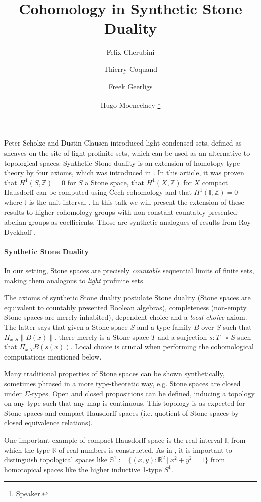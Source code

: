 \documentclass[letterpaper]{../util/easychair}
\title{Cohomology in Synthetic Stone Duality 
}
\author{
Felix Cherubini %
\and 
 Thierry Coquand%
\and 
 Freek Geerligs%
\and
 Hugo Moeneclaey %
\thanks{Speaker.}%
}
\institute{
  University of Gothenburg and Chalmers University of Technology, Gothenburg, Sweden%
}
\newcommand{\R}{\mathbb{R}}
\newcommand{\Z}{\mathbb{Z}}
\newcommand{\I}{\mathbb{I}}
\newcommand{\bS}{\mathbb{S}}
\begin{document}
\maketitle
Peter Scholze and Dustin Clausen \cite{Scholze} introduced light condensed sets, defined as sheaves on the site of light profinite sets, which can be used as an alternative to topological spaces. 
Synthetic Stone duality is an extension of homotopy type theory by four axioms, which was introduced in \cite{synthetic-stone-duality}. In this article, it was proven that $H^1(S,\Z) = 0$ for $S$ a Stone space, that $H^1(X,\Z)$ for $X$ compact Hausdorff can be computed using \v{C}ech cohomology and that $H^1(\mathbb{I},\Z) = 0$ where $\mathbb{I}$ is the unit interval \cite{synthetic-stone-duality}. In this talk we will present the extension of these results to higher cohomology groups with non-constant countably presented abelian groups as coefficients. Those are synthetic analogues of results from Roy Dyckhoff \cite{dyckhoff76,dyckhoff76-1}.

\paragraph*{Synthetic Stone Duality}

In our setting, Stone spaces are precisely \emph{countable} sequential limits of finite sets, making them analogous to \emph{light} profinite sets. 

The axioms of synthetic Stone duality postulate Stone duality (Stone spaces are equivalent to countably presented Boolean algebras), completeness (non-empty Stone spaces are merely inhabited), dependent choice and a \emph{local-choice} axiom. The latter says that given a Stone space $S$ and a type family $B$ over $S$ such that $\Pi_{x:S} \| B(x)  \|$, there merely is a Stone space $T$ and a surjection $s:T\twoheadrightarrow S$ such that $\Pi_{x:T} B(s(x))$. Local choice is crucial when performing the cohomological computations mentioned below.

Many traditional properties of Stone spaces can be shown synthetically, sometimes phrased in a more type-theoretic way, e.g. Stone spaces are closed under $\Sigma$-types. Open and closed propositions can be defined, inducing a topology on any type such that any map is continuous. This topology is as expected for Stone spaces and compact Hausdorff spaces (i.e. quotient of Stone spaces by closed equivalence relations).

One important example of compact Hausdorff space is the real interval $\I$, from which the type $\R$  of real numbers is constructed.
As in \cite{shulman-Brouwer-fixed-point}, it is important to distinguish topological spaces like $\bS^1:=\{(x,y):\R^2\ \vert\ x^2+y^2=1\}$ from homotopical spaces like the higher inductive 1-type $S^1$.
\end{document}
